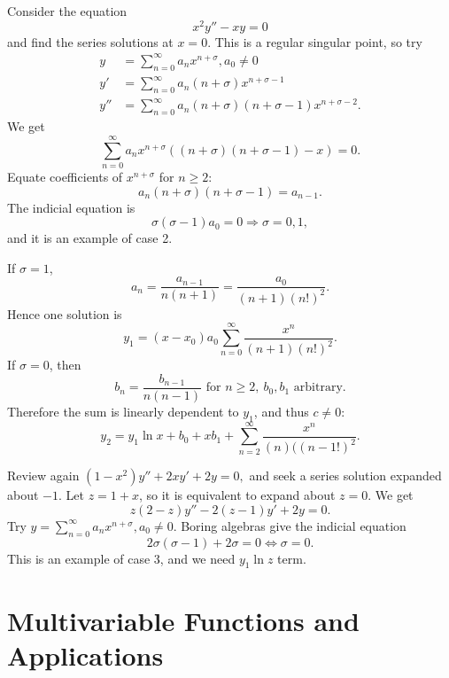 \documentclass[10pt]{article}
\def\ge{\geqslant}
\begin{document}
    \begin{example}
        Consider the equation
        \begin{equation}\label{eq:19.1}
            x^2y''-xy=0
        \end{equation}
        and find the series solutions at $x=0$. This is a regular singular point, so try
        \begin{align*}
            y&=\sum_{n=0}^{\infty}a_nx^{n+\sigma}, a_0\neq 0\\
            y'&= \sum_{n=0}^{\infty}a_n(n+\sigma)x^{n+\sigma-1}\\
            y''&=\sum_{n=0}^{\infty} a_n(n+\sigma)(n+\sigma-1)x^{n+\sigma-2}.
        \end{align*}
        We get 
        \[
            \sum_{n=0}^{\infty}a_nx^{n+\sigma}\left( (n+\sigma)(n+\sigma-1)-x \right)=0.
        \]
        Equate coefficients of $ x^{n+\sigma} $ for $n\ge 2$:
        \[
            a_n(n+\sigma)(n+\sigma-1)=a_{n-1}.
        \]
        The indicial equation is 
        \[
            \sigma(\sigma-1)a_0=0 \Longrightarrow \sigma=0,1,
        \]
        and it is an example of case 2.

        If $ \sigma=1 $, 
        \[
            a_n = \frac{a_{n-1}}{n(n+1)} = \frac{a_0}{(n+1)(n!)^2}.
        \]
        Hence one solution is 
        \[
            y_1 = (x-x_0) a_0\sum_{n=0}^{\infty} \frac{x^n}{(n+1)(n!)^2}.
        \]
        If $ \sigma=0 $, then 
        \[
            b_n = \frac{b_{n-1}}{n(n-1)} \text{ for }n\ge 2,\ b_0,b_1 \text{ arbitrary}.
        \]
        Therefore the sum is linearly dependent to $y_1$, and thus $c\neq 0$:
        \[
            y_2 = y_1 \ln x + b_0 + xb_1 + \sum_{n=2}^{\infty}\frac{x^n}{(n)((n-1!)^2}.
        \]
    \end{example}
    \begin{example}
        Review again $(1-x^2)y''+2xy'+2y=0,$ and seek a series solution expanded about $-1$. Let $z=1+x$, so it is equivalent to expand about $z=0$. We get 
        \[
            z(2-z)y''-2(z-1)y'+2y=0.
        \]
        Try $y=\sum_{n=0}^{\infty}a_nx^{n+\sigma}, a_0\neq 0$. Boring algebras give the indicial equation 
        \[
            2\sigma(\sigma-1)+2\sigma=0 \Longleftrightarrow \sigma=0.
        \]
        This is an example of case 3, and we need $ y_1\ln z $ term.
    \end{example}
    \part{Multivariable Functions and Applications}
\end{document}
